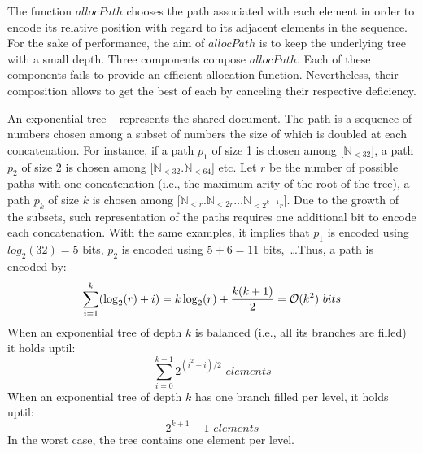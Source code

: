 The function $allocPath$ chooses the path associated with each element in order
to encode its relative position with regard to its adjacent elements in the
sequence. For the sake of performance, the aim of $allocPath$ is to keep the
underlying tree with a small depth. Three components compose $allocPath$. Each
of these components fails to provide an efficient allocation
function. Nevertheless, their composition allows to get the best of each by
canceling their respective deficiency.
\begin{asparadesc}
\item [An exponential tree]~\cite{andersson1996faster,andersson2007dynamic}
  represents the shared document. The path is a sequence of numbers chosen among
  a subset of numbers the size of which is doubled at each concatenation. For
  instance, if a path $p_1$ of size 1 is chosen among [$\mathbb{N}_{<32}$], a
  path $p_2$ of size 2 is chosen among [$\mathbb{N}_{<32}.\mathbb{N}_{<64}$]
  etc. Let $r$ be the number of possible paths with one concatenation (i.e., the
  maximum arity of the root of the tree), a path $p_k$ of size $k$ is chosen
  among [$\mathbb{N}_{<r}.\mathbb{N}_{<2r}\ldots\mathbb{N}_{<2^{k-1}r}$].  Due
  to the growth of the subsets, such representation of the paths requires one
  additional bit to encode each concatenation. With the same examples, it
  implies that $p_1$ is encoded using $log_2(32)=5$ bits, $p_2$ is encoded using
  $5+6=11$ bits,~\ldots Thus, a path is encoded by:
  \begin{equation}
    \sum\limits_{i=1}^{k}(\log_2(r)+i) =
    k\log_2(r) + {k(k+1)\over{2}} = \mathcal{O}(k^2) \,\, bits
  \end{equation}
  When an exponential tree of depth $k$ is balanced (i.e., all its branches
  are filled) it holds uptil:
  \begin{equation} \sum\limits_{i=0}^{k-1} {2^{(i^2-i)/2}} \,\, elements
  \end{equation}
  When an exponential tree of depth $k$ has one branch filled per level, it
  holds uptil:
  \begin{equation} 2^{k+1}-1 \,\, elements\end{equation} 
  In the worst case, the tree contains one element per level.
  

\end{asparadesc}
